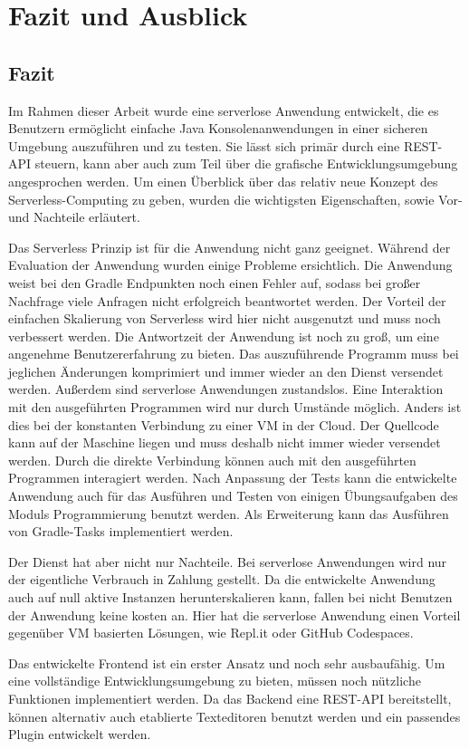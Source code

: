 \chapter{Fazit und Ausblick}

\section{Fazit}
Im Rahmen dieser Arbeit wurde eine serverlose Anwendung entwickelt,
die es Benutzern ermöglicht einfache Java Konsolenanwendungen in
einer sicheren Umgebung auszuführen und zu testen. Sie
lässt sich primär durch eine REST-API steuern, kann aber auch
zum Teil über die grafische Entwicklungsumgebung angesprochen
werden. Um einen Überblick über das relativ neue Konzept des
Serverless-Computing zu geben, wurden die wichtigsten Eigenschaften,
sowie Vor- und Nachteile erläutert.

Das Serverless Prinzip ist für die Anwendung nicht ganz
geeignet. Während der Evaluation der Anwendung wurden einige Probleme
ersichtlich. Die Anwendung weist bei den Gradle Endpunkten noch
einen Fehler auf, sodass bei großer Nachfrage viele Anfragen
nicht erfolgreich beantwortet werden. Der Vorteil der
einfachen Skalierung von Serverless wird hier nicht ausgenutzt und
muss noch verbessert werden. Die Antwortzeit der Anwendung ist noch zu groß,
um eine angenehme Benutzererfahrung zu bieten. Das
auszuführende Programm muss bei jeglichen Änderungen
komprimiert und immer wieder an den Dienst versendet
werden. Außerdem sind serverlose Anwendungen zustandslos.
Eine Interaktion mit den ausgeführten Programmen wird nur durch
Umstände möglich. Anders ist dies bei der konstanten Verbindung zu
einer VM in der Cloud. Der Quellcode kann auf der Maschine
liegen und muss deshalb nicht immer wieder versendet werden.
Durch die direkte Verbindung können auch mit den ausgeführten Programmen
interagiert werden. Nach Anpassung der Tests kann die entwickelte
Anwendung auch für das Ausführen und Testen von 
einigen Übungsaufgaben des Moduls Programmierung benutzt werden.
Als Erweiterung kann das Ausführen von Gradle-Tasks implementiert
werden.

Der Dienst hat aber nicht nur Nachteile.
Bei serverlose Anwendungen wird nur der eigentliche Verbrauch
in Zahlung gestellt. Da die entwickelte Anwendung auch
auf null aktive Instanzen herunterskalieren kann, fallen bei nicht Benutzen
der Anwendung keine kosten an. Hier hat die serverlose Anwendung einen
Vorteil gegenüber VM basierten Lösungen, wie Repl.it oder
GitHub Codespaces.

Das entwickelte Frontend ist ein erster Ansatz und noch sehr
ausbaufähig. Um eine vollständige Entwicklungsumgebung zu bieten,
müssen noch nützliche Funktionen implementiert werden.
Da das Backend eine REST-API bereitstellt, können
alternativ auch etablierte Texteditoren benutzt werden und ein passendes
Plugin entwickelt werden.


 

